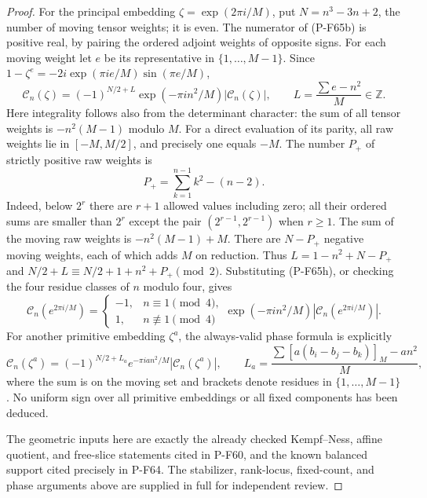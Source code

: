 \begin{proof}
For the principal embedding $\zeta=\exp(2\pi i/M)$, put
$N=n^3-3n+2$, the number of moving tensor weights; it is even.
The numerator of (P-F65b) is positive real, by pairing the
ordered adjoint weights of opposite signs.  For each moving
weight let $e$ be its representative in $\{1,\ldots,M-1\}$.
Since $1-\zeta^e=-2i\exp(\pi i e/M)\sin(\pi e/M)$,
\[
 \mathcal C_n(\zeta)=(-1)^{N/2+L}
       \exp(-\pi i n^2/M)|\mathcal C_n(\zeta)|,
 \qquad L=\frac{\sum e-n^2}{M}\in\mathbb Z.           \tag{P-F65g}
\]
Here integrality follows also from the determinant character:
the sum of all tensor weights is $-n^2(M-1)$ modulo $M$.
For a direct evaluation of its parity, all raw weights lie
in $[-M,M/2]$, and precisely one equals $-M$.
The number $P_+$ of strictly positive raw weights is
\[
 P_+=\sum_{k=1}^{n-1}k^2-(n-2).                        \tag{P-F65h}
\]
Indeed, below $2^r$ there are $r+1$ allowed values including
zero; all their ordered sums are smaller than $2^r$ except the
pair $(2^{r-1},2^{r-1})$ when $r\ge1$.
The sum of the moving raw weights is $-n^2(M-1)+M$.
There are $N-P_+$ negative moving weights, each of which adds
$M$ on reduction.  Thus
$L=1-n^2+N-P_+$ and
$N/2+L\equiv N/2+1+n^2+P_+\pmod2$.
Substituting (P-F65h), or checking the four residue classes
of $n$ modulo four, gives
\[
 \mathcal C_n(e^{2\pi i/M})=
 \begin{cases}-1,&n\equiv1\pmod4,\\1,&n\not\equiv1\pmod4\end{cases}
 \exp(-\pi i n^2/M)|\mathcal C_n(e^{2\pi i/M})|.        \tag{P-F65i}
\]
For another primitive embedding $\zeta^a$, the always-valid
phase formula is explicitly
\[
 \mathcal C_n(\zeta^a)=(-1)^{N/2+L_a}
 e^{-\pi i a n^2/M}|\mathcal C_n(\zeta^a)|,\qquad
 L_a=\frac{\sum [a(b_i-b_j-b_k)]_M-a n^2}{M},
 \tag{P-F65j}
\]
where the sum is on the moving set and brackets denote residues
in $\{1,\ldots,M-1\}$.
No uniform sign over all primitive embeddings or all fixed
components has been deduced.

The geometric inputs here are exactly the already checked
Kempf--Ness, affine quotient, and free-slice statements cited
in P-F60, and the known balanced support cited precisely in
P-F64.  The stabilizer, rank-locus, fixed-count, and phase
arguments above are supplied in full for independent review.

\end{proof}

